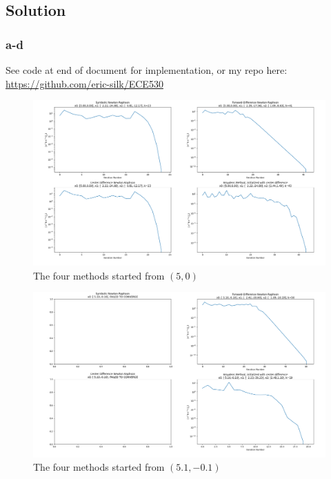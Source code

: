 \documentclass[11pt]{report}
\theoremstyle{definition}
\begin{document}
\subsection*{Solution}
\subsubsection*{a-d}
See code at end of document for implementation, or my repo here:\newline\noindent
\href{https://github.com/eric-silk/ECE530}{https://github.com/eric-silk/ECE530}

\begin{figure}
	\centering
	\includegraphics[width=1.25\textwidth, angle=90]{Figure_1.png}
	\caption{The four methods started from $(5, 0)$}
\end{figure}
\begin{figure}
	\centering
	\includegraphics[width=1.25\textwidth, angle=90]{Figure_2.png}
	\caption{The four methods started from $(5.1, -0.1)$}
\end{figure}
\end{document}
